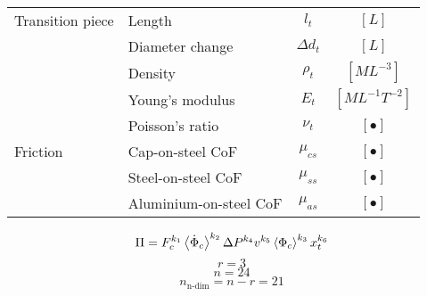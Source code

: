 \documentclass{article}
\begin{document}
\begin{table}[!htb]
\begin{tabular}{l p{7cm} c c}
		\hline
		Transition piece& Length & $l_{t}$ & $[L]$\\
		& Diameter change & $\Delta d_{t}$ & $[L]$\\
		&Density & $\rho_{t}$ & $[ML^{-3}]$\\
		&Young's modulus & $E_{t}$ & $[ML^{-1}T^{-2}]$\\
		&Poisson's ratio & $\nu_{t}$ & $[\bullet]$\\
		\hline
		Friction & Cap-on-steel CoF & $\mu_{cs}$ & $[\bullet]$\\	
		&Steel-on-steel CoF & $\mu_{ss}$ & $[\bullet]$\\
		&Aluminium-on-steel CoF & $\mu_{as}$ & $[\bullet]$\\	
	\end{tabular}
\end{table}

\begin{equation}
	\Pi = F_c^{k_{1}}\left<\dot{\Phi}_{c}\right>^{k_{2}}\Delta P^{k_{4}}v^{k_{5}}\left<\Phi_{c}\right>^{k_{3}}x_{t}^{k_{6}}
\end{equation}
\begin{equation}
	r=3
\end{equation}
\begin{equation}
	n=24
\end{equation}
\begin{equation}
	n_{\text{n-dim}} = n-r=21
\end{equation}
\end{document}
